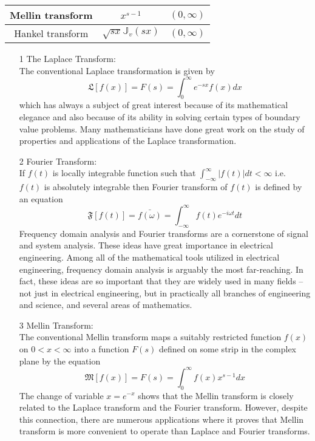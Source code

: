 \begin{large}
\begin{center}
\begin{tabular}{|c|c|c|}
   \hline
   Mellin transform & $ x^{s-1} $ & $(0,\infty)$  \\
   \hline
   Hankel transform & $\sqrt{sx} \mathbb{J}_{v}(sx)$ & $(0,\infty)$ \\ [1ex]
   \hline
\end{tabular}
\end{center}
\begin{itemize}
\item[1] The Laplace Transform:\\
The conventional Laplace transformation is given by
\begin{equation}
\mathfrak{L}[f(x)]=F(s)=\int_{0}^{\infty}e^{-sx}f(x)dx
\end{equation}
which has always a subject  of great interest because of its mathematical elegance and also because of its  ability in solving certain types of boundary value problems. Many mathematicians have done great work on the study of properties and applications of the Laplace transformation.
\item[2]Fourier Transform:\\
If $f(t)$ is locally integrable function such that $ \int_{-\infty}^{\infty}\vert f(t)\vert dt < \infty $ i.e. $ f(t) $ is absolutely integrable then Fourier transform of $ f(t) $ is defined by an equation
\begin{equation*}
\mathfrak{F}[f(t)]=\bar{f(\omega)}=\int_{-\infty}^{\infty}f(t)e^{-i\omega t}dt
\end{equation*}
Frequency domain analysis and Fourier transforms are a cornerstone of signal and system analysis. These ideas have great importance in electrical engineering. Among all of the mathematical tools utilized in electrical
engineering, frequency domain analysis is arguably the most far-reaching. In fact, these ideas are so important that they are widely used in many fields – not just in electrical engineering, but in practically all branches of engineering and science, and several areas of mathematics.
\item[3]Mellin Transform:\\
The conventional Mellin transform maps a suitably restricted function $ f(x) $ on $0< x < \infty $ into a function $F(s)$ defined on some strip in the complex plane by the equation
\begin{equation*}
\mathfrak{M}[f(x)]=F(s)=\int_{0}^{\infty}f(x)x^{s-1}dx
\end{equation*}
The change of variable $ x=e^{-x} $ shows that the Mellin transform is closely related to the Laplace transform and the Fourier transform. However, despite this connection, there are numerous applications where it proves that Mellin transform is more convenient to operate than Laplace and Fourier transforms.

\end{itemize}
\end{large}
